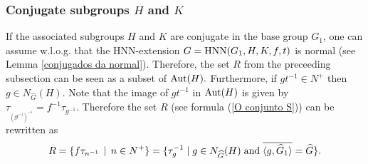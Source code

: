 \documentclass[a4paper,12pt]{article}
\def\aut {{\rm Aut}}
\def\hnn {{\rm HNN}}
\begin{document}
{\subsubsection{Conjugate subgroups $H$ and $K$}

If the associated subgroups $H$ and $K$ are conjugate in the base group $G_1$,  one can assume w.l.o.g. that the HNN-extension $G=\hnn(G_1, H, K, f,t)$ is normal (see Lemma \ref{conjugados da normal}). Therefore,  the set $R$ from the preceeding subsection can be seen as a subset of $\aut(H).$  Furthermore,  
if $gt^{-1} \in N^{+}$ then $g \in N_{\widehat G}(H)$. %
Note that the image of $gt^{-1}$ in $\aut(H)$ is given by $\tau_{_{(gt^{-1})^{-1}}}=f^{-1} \tau_{g^{-1 }}.$ Therefore the set $R$ (see formula (\ref{O conjunto S})) can be rewritten as \begin{equation} \label{conjunto S com BZ} R=\{f\tau_{n^{-1}}\,\mid\, n \in N^{+}\}= \{ \tau_{g}^{-1} \mid g \in N_{\widehat G}(H) \hspace{0.1cm} \mbox{and} \hspace{0.1cm}   \overline{ \langle g, \widehat G_1 \rangle}  =\widehat G \}.\end{equation} 





}
\end{document}
